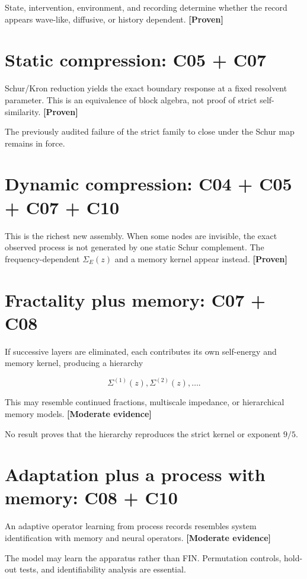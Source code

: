 \documentclass[11pt,a4paper,openany]{report}
\newcommand{\statusProven}{\textcolor{fingreen}{[Proven]}}
\newcommand{\statusModerate}{\textcolor{finviolet}{[Moderate evidence]}}
\begin{document}
State, intervention, environment, and recording determine whether the record appears wave-like, diffusive, or history dependent. \textbf{\statusProven{}}

\section{Static compression: C05 + C07}

Schur/\allowbreak{}Kron reduction yields the exact boundary response at a fixed resolvent parameter. This is an equivalence of block algebra, not proof of strict self-similarity. \textbf{\statusProven{}}

The previously audited failure of the strict family to close under the Schur map remains in force.

\section{Dynamic compression: C04 + C05 + C07 + C10}

This is the richest new assembly. When some nodes are invisible, the exact observed process is not generated by one static Schur complement. The frequency-dependent \(\Sigma_E(z)\) and a memory kernel appear instead. \textbf{\statusProven{}}

\section{Fractality plus memory: C07 + C08}

If successive layers are eliminated, each contributes its own self-energy and memory kernel, producing a hierarchy

\[
\Sigma^{(1)}(z),\Sigma^{(2)}(z),\ldots.
\]

This may resemble continued fractions, multiscale impedance, or hierarchical memory models. \textbf{\statusModerate{}}

No result proves that the hierarchy reproduces the strict kernel or exponent \(9/5\).

\section{Adaptation plus a process with memory: C08 + C10}

An adaptive operator learning from process records resembles system identification with memory and neural operators. \textbf{\statusModerate{}}

The model may learn the apparatus rather than FIN. Permutation controls, hold-out tests, and identifiability analysis are essential.
\end{document}
